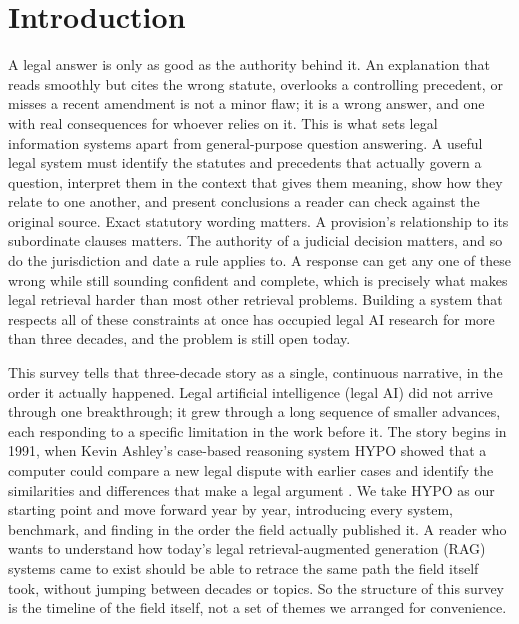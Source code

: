 \section{Introduction}
\label{sec:intro}

A legal answer is only as good as the authority behind it. An explanation that reads smoothly but
cites the wrong statute, overlooks a controlling precedent, or misses a recent amendment is not a
minor flaw; it is a wrong answer, and one with real consequences for whoever relies on it. This is
what sets legal information systems apart from general-purpose question answering. A useful legal
system must identify the statutes and precedents that actually govern a question, interpret them in
the context that gives them meaning, show how they relate to one another, and present conclusions a
reader can check against the original source. Exact statutory wording matters. A provision's
relationship to its subordinate clauses matters. The authority of a judicial decision matters, and
so do the jurisdiction and date a rule applies to. A response can get any one of these wrong while
still sounding confident and complete, which is precisely what makes legal retrieval harder than
most other retrieval problems. Building a system that respects all of these constraints at once has
occupied legal AI research for more than three decades, and the problem is still open today.

This survey tells that three-decade story as a single, continuous narrative, in the order it
actually happened. Legal artificial intelligence (legal AI) did not arrive through one breakthrough;
it grew through a long sequence of smaller advances, each responding to a specific limitation in the
work before it. The story begins in 1991, when Kevin Ashley's case-based reasoning system HYPO showed
that a computer could compare a new legal dispute with earlier cases and identify the similarities
and differences that make a legal argument \citep{ashley1991}. We take HYPO as our starting point and
move forward year by year, introducing every system, benchmark, and finding in the order the field
actually published it. A reader who wants to understand how today's legal retrieval-augmented
generation (RAG) systems came to exist should be able to retrace the same path the field itself took,
without jumping between decades or topics. So the structure of this survey is the timeline of the
field itself, not a set of themes we arranged for convenience.

